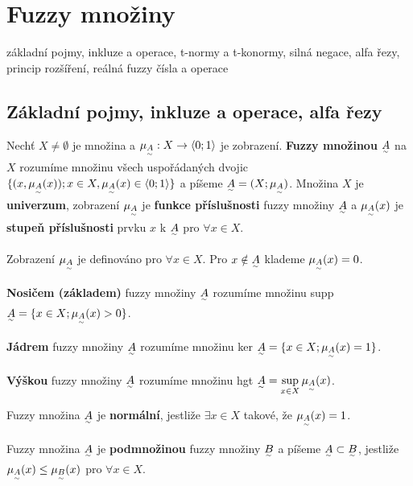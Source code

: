 {\section{ Fuzzy množiny}
základní pojmy, inkluze a operace, t-normy a t-konormy, silná negace, alfa řezy, princip rozšíření, reálná fuzzy čísla a operace

\subsection{Základní pojmy, inkluze a operace, alfa řezy}

\begin{definition}
Nechť $X \neq \emptyset$ je množina a $\mu_{\underset{^\sim}A}: X \rightarrow \langle 0;1 \rangle$ je zobrazení. \textbf{Fuzzy množinou} $\underset{^\sim}A$ na $X$ rozumíme množinu všech uspořádaných dvojic $\lbrace (x, \mu_{\underset{^\sim}A}(x)); x \in X, \mu_{\underset{^\sim}A}(x) \in \langle 0;1 \rangle \rbrace$ a píšeme $\underset{^\sim}A = (X; \mu_{\underset{^\sim}A})$. Množina $X$ je \textbf{univerzum}, zobrazení $\mu_{\underset{^\sim}A}$ je \textbf{funkce příslušnosti} fuzzy množiny $\underset{^\sim}A$ a $\mu_{\underset{^\sim}A}(x)$ je \textbf{stupeň příslušnosti} prvku $x$ k $\underset{^\sim}A$ pro $\forall x \in X$.
\end{definition}

\begin{remark}
Zobrazení $\mu_{\underset{^\sim}A}$ je definováno pro $\forall x \in X$. Pro $x \notin \underset{^\sim}A$ klademe $\mu_{\underset{^\sim}A}(x)=0$.
\end{remark}

\begin{definition}
\textbf{Nosičem (základem)} fuzzy množiny $\underset{^\sim}A$ rozumíme množinu supp $\underset{^\sim}A = \lbrace x \in X; \mu_{\underset{^\sim}A}(x) > 0 \rbrace$.
\end{definition}

\begin{definition}
\textbf{Jádrem} fuzzy množiny $\underset{^\sim}A$ rozumíme množinu ker $\underset{^\sim}A = \lbrace x \in X; \mu_{\underset{^\sim}A}(x) = 1 \rbrace$.
\end{definition}

\begin{definition}
\textbf{Výškou} fuzzy množiny $\underset{^\sim}A$ rozumíme množinu hgt $\underset{^\sim}A = \sup\limits_{x \in X} \mu_{\underset{^\sim}A}(x)$.
\end{definition}

\begin{definition}
Fuzzy množina $\underset{^\sim}A$ je \textbf{normální}, jestliže $\exists x \in X$ takové, že $\mu_{\underset{^\sim}A}(x) = 1$.
\end{definition}

\begin{definition}
Fuzzy množina $\underset{^\sim}A$ je \textbf{podmnožinou} fuzzy množiny $\underset{^\sim}B$ a píšeme $\underset{^\sim}A \subset \underset{^\sim}B$, jestliže $\mu_{\underset{^\sim}A}(x) \leq \mu_{\underset{^\sim}B}(x)$ pro $\forall x \in X$.
\end{definition}

}

